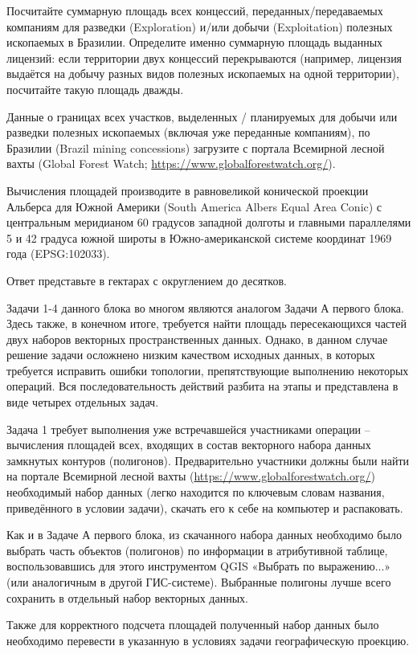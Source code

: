 
Посчитайте суммарную площадь всех концессий, переданных/передаваемых компаниям для разведки (Exploration) и/или добычи (Exploitation) полезных ископаемых в Бразилии. Определите именно суммарную площадь выданных лицензий: если территории двух концессий перекрываются (например, лицензия выдаётся на добычу разных видов полезных ископаемых на одной территории), посчитайте такую площадь дважды.

Данные о границах всех участков, выделенных / планируемых для добычи или разведки полезных ископаемых 
(включая уже переданные компаниям), по Бразилии (Brazil mining concessions) загрузите с портала Всемирной 
лесной вахты (Global Forest Watch; \url{https://www.globalforestwatch.org/}).

Вычисления площадей производите в равновеликой конической проекции Альберса для Южной Америки (South America Albers Equal Area Conic) с центральным меридианом 60 градусов западной долготы и главными параллелями 5 и 42 градуса южной широты в Южно-американской системе координат 1969 года (EPSG:102033). 

Ответ представьте в гектарах с округлением до десятков.

\explanationSection

Задачи 1-4 данного блока во многом являются аналогом Задачи А первого блока. Здесь также, в конечном итоге, требуется найти площадь пересекающихся частей двух наборов векторных пространственных данных. Однако, в данном случае решение задачи осложнено низким качеством исходных данных, в которых требуется исправить ошибки топологии, препятствующие выполнению некоторых операций. Вся последовательность действий разбита на этапы и представлена в виде четырех отдельных задач.

Задача 1 требует выполнения уже встречавшейся участниками операции – вычисления площадей всех, входящих в состав векторного набора данных замкнутых контуров (полигонов). Предварительно участники должны были найти на портале Всемирной лесной вахты (\url{https://www.globalforestwatch.org/}) необходимый набор данных (легко находится по ключевым словам названия, приведённого в условии задачи), скачать его к себе на компьютер и распаковать.

Как и в Задаче А первого блока, из скачанного набора данных необходимо было выбрать часть объектов (полигонов) по информации в атрибутивной таблице, воспользовавшись для этого инструментом QGIS «Выбрать по выражению...» (или аналогичным в другой ГИС-системе). Выбранные полигоны лучше всего сохранить в отдельный набор векторных данных.

Также для корректного подсчета площадей полученный набор данных было необходимо перевести в указанную в условиях задачи географическую проекцию.

